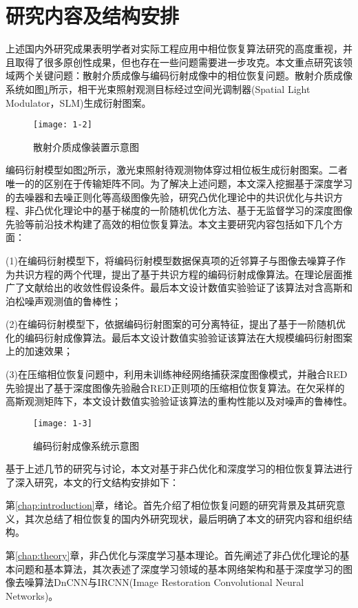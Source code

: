 \section{研究内容及结构安排}
上述国内外研究成果表明学者对实际工程应用中相位恢复算法研究的高度重视，并且取得了很多原创性成果，但也存在一些问题需要进一步攻克。本文重点研究该领域两个关键问题：散射介质成像与编码衍射成像中的相位恢复问题。散射介质成像系统如图\ref{fig:1-2}所示，相干光束照射观测目标经过空间光调制器(Spatial Light Modulator，SLM)生成衍射图案\supercite{Metzler0}。
\begin{figure}[!htbp]
	\setlength{\abovecaptionskip}{-0.02\linewidth}   
	\centering
	\texttt{[image: 1-2]}
	\caption{散射介质成像装置示意图}\label{fig:1-2}
\end{figure}

编码衍射模型如图\ref{fig:1-3}所示，激光束照射待观测物体穿过相位板生成衍射图案\supercite{Candes}。二者唯一的的区别在于传输矩阵不同。为了解决上述问题，本文深入挖掘基于深度学习的去噪器和去噪正则化等高级图像先验，研究凸优化理论中的共识优化与共识方程、非凸优化理论中的基于梯度的一阶随机优化方法、基于无监督学习的深度图像先验等前沿技术构建了高效的相位恢复算法。本文主要研究内容包括如下几个方面：

(1)在编码衍射模型下，将编码衍射模型数据保真项的近邻算子与图像去噪算子作为共识方程的两个代理，提出了基于共识方程的编码衍射成像算法。在理论层面推广了文献\cite{Xiran}给出的收敛性假设条件。最后本文设计数值实验验证了该算法对含高斯和泊松噪声观测值的鲁棒性；

(2)在编码衍射模型下，依据编码衍射图案的可分离特征，提出了基于一阶随机优化的编码衍射成像算法。最后本文设计数值实验验证该算法在大规模编码衍射图案上的加速效果；

(3)在压缩相位恢复问题中，利用未训练神经网络捕获深度图像模式，并融合RED先验提出了基于深度图像先验融合RED正则项的压缩相位恢复算法。在欠采样的高斯观测矩阵下，本文设计数值实验验证该算法的重构性能以及对噪声的鲁棒性。
\begin{figure}[!hptb]  
	\centering
	\texttt{[image: 1-3]}
	\caption{编码衍射成像系统示意图}\label{fig:1-3}
\end{figure}

基于上述几节的研究与讨论，本文对基于非凸优化和深度学习的相位恢复算法进行了深入研究，本文的行文结构安排如下：

第\ref{chap:introduction}章，绪论。首先介绍了相位恢复问题的研究背景及其研究意义，其次总结了相位恢复的国内外研究现状，最后明确了本文的研究内容和组织结构。

第\ref{chap:theory}章，非凸优化与深度学习基本理论。首先阐述了非凸优化理论的基本问题和基本算法，其次表述了深度学习领域的基本网络架构和基于深度学习的图像去噪算法DnCNN与IRCNN(Image Restoration Convolutional Neural Networks)。

